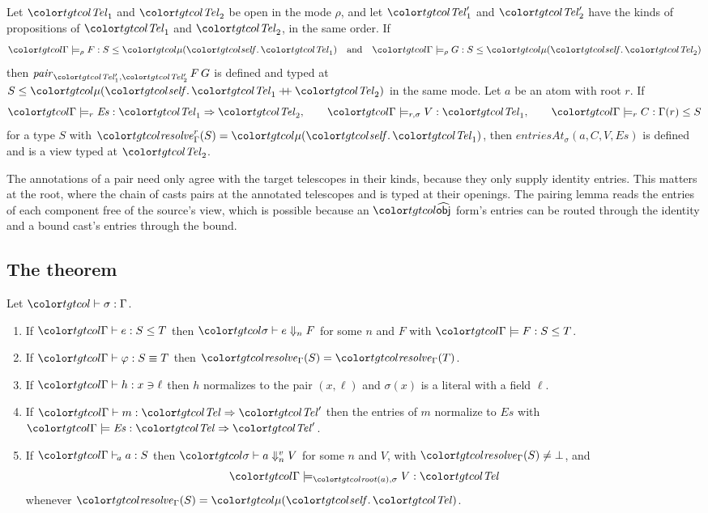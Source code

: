 \begin{lemma}\label{lem:pair-apply}
Let $\tel_1$ and $\tel_2$ be open in the mode $\rho$, and let $\tel'_1$ and $\tel'_2$ have the kinds of propositions of $\tel_1$ and $\tel_2$, in the same order. If
\[ \chainj{\Gamma}{\rho}{F}{S}{\obj{\tel_1}} \quad\text{and}\quad \chainj{\Gamma}{\rho}{G}{S}{\obj{\tel_2}} \]
then $\mathit{pair}_{\tel'_1,\tel'_2}\,F\,G$ is defined and typed at $S \le \obj{\tel_1 \mathbin{+\!\!+} \tel_2}$ in the same mode. Let $a$ be an atom with root $r$. If
\[ \entjm{\Gamma}{r}{\mathit{Es}}{\tel_1}{\tel_2}, \qquad \viewj{\Gamma}{r}{\sigma}{V}{\tel_1}, \qquad \chainj{\Gamma}{r}{C}{\Gamma(r)}{S} \]
for a type $S$ with $\resolveAt{\Gamma}{r}{S} = \obj{\tel_1}$, then $\mathit{entriesAt}_\sigma(a, C, V, \mathit{Es})$ is defined and is a view typed at $\tel_2$.
\end{lemma}

The annotations of a pair need only agree with the target telescopes in their kinds, because they only supply identity entries. This matters at the root, where the chain of casts pairs at the annotated telescopes and is typed at their openings. The pairing lemma reads the entries of each component free of the source's view, which is possible because an $\form{obj}$ form's entries can be routed through the identity and a bound cast's entries through the bound.

\subsection{The theorem}

\begin{theorem}\label{thm:canon}
Let $\storej{\sigma}{\Gamma}$.
\begin{enumerate}
\item If $\lej{\Gamma}{e}{S}{T}$ then $\hnf{\sigma}{e}{n}{F}$ for some $n$ and $F$ with $\formj{\Gamma}{F}{S}{T}$.
\item If $\eqj{\Gamma}{\varphi}{S}{T}$ then $\resolve{\Gamma}{S} = \resolve{\Gamma}{T}$.
\item If $\hasj{\Gamma}{h}{x}{\ell}$ then $h$ normalizes to the pair $(x, \ell)$ and $\sigma(x)$ is a literal with a field $\ell$.
\item If $\morj{\Gamma}{m}{\tel}{\tel'}$ then the entries of $m$ normalize to $\mathit{Es}$ with $\entj{\Gamma}{\mathit{Es}}{\tel}{\tel'}$.
\item If $\atomj{\Gamma}{a}{S}$ then $\vw{\sigma}{a}{n}{V}$ for some $n$ and $V$, with $\resolve{\Gamma}{S} \neq \bot$, and
\[ \viewj{\Gamma}{\rt{a}}{\sigma}{V}{\tel} \]
whenever $\resolve{\Gamma}{S} = \obj{\tel}$.
\end{enumerate}
\end{theorem}

